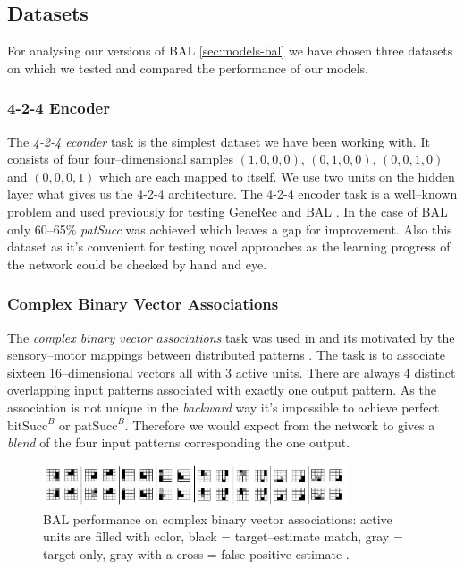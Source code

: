 
\subsection{Datasets}  
For analysing our versions of BAL \ref{sec:models-bal} we have chosen three datasets on which we tested and compared the performance of our models. 

\subsubsection{4-2-4 Encoder} 
\label{sec:datasets-auto4}


The \emph{4-2-4 econder} task is the simplest dataset we have been working with. It consists of four four--dimensional samples $(1,0,0,0)$, $(0,1,0,0)$, $(0,0,1,0)$ and $(0,0,0,1)$ which are each mapped to itself. We use two units on the hidden layer what gives us the 4-2-4 architecture. The 4-2-4 encoder task is a well--known problem and used previously for testing GeneRec \citep{o1996bio} and BAL \citep{farkas2013bal}. In the case of BAL only 60--65\% \emph{patSucc} was achieved which leaves a gap for improvement. Also this dataset as it's convenient for testing novel approaches as the learning progress of the network could be checked by hand and eye. 


\subsubsection{Complex Binary Vector Associations} 
\label{sec:datasets-k3}

The \emph{complex binary vector associations} task was used in \citet{farkas2013bal} and its motivated by the sensory--motor mappings between distributed patterns \citep{farkas2013bal}. The task is to associate sixteen 16--dimensional vectors all with 3 active units. There are always 4 distinct overlapping input patterns associated with exactly one output pattern. As the association is not unique in the \emph{backward} way it's impossible to achieve perfect $\mbox{bitSucc}^B$ or $\mbox{patSucc}^B$. Therefore we would expect from the network to gives a \emph{blend} of the four input patterns corresponding the one output. 

\begin{figure}[h]
  \centering
  \includegraphics[width=0.8\textwidth]{img/cbva_back_repre.png} 
  \caption{BAL performance on complex binary vector associations: active units are filled with color, black = target–estimate match, gray = target only, gray with a cross = false-positive estimate \citep{farkas2013bal}.}
  \label{fig:datasets-k3}
\end{figure}

